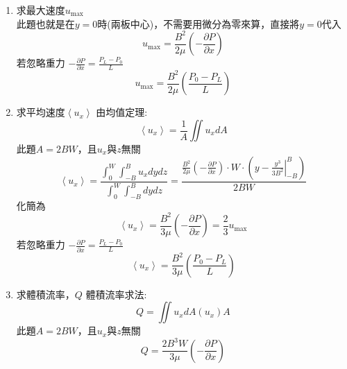 \documentclass[../main.tex]{subfiles}
\begin{document}
\begin{itemize}
\begin{enumerate}
      \begin{equation}
        \boxed{u_x = \frac{B^2}{2\mu}\left(\frac{P_0-P_L}{L}\right)\left[
          1-\left(\frac{y}{B}\right)^2
        \right]}
      \end{equation}
    \item 求最大速度$u_{\text{max}}$\\
      此題也就是在$y=0$時(兩板中心)，不需要用微分為零來算，直接將$y=0$代入
      \begin{equation}
        \boxed{u_{\text{max}} = \frac{B^2}{2\mu}\left(-\frac{\partial P}{\partial x}\right)}
      \end{equation}
      若忽略重力 $ -\frac{\partial P}{\partial x} = \frac{P_L-P_0}{L}$
      \begin{equation}
        \boxed{u_{\text{max}} = \frac{B^2}{2\mu}\left(\frac{P_0-P_L}{L}\right)}
      \end{equation}
    \item 求平均速度$\left<u_x\right>$
      由均值定理:
      \begin{equation}
        \left<u_x\right> =\frac{1}{A}\iint u_x dA
      \end{equation}
      此題$A=2BW$，且$u_x$與$z$無關
      \begin{equation}
        \left<u_x\right> = \frac{
          \int_0^W\int_{-B}^{B} u_x dy dz
        }{\int_0^W\int_{-B}^{B} dy dz} = \frac{\frac{B^2}{2\mu}\left(-\frac{\partial P}{\partial x}\right)\cdot W \cdot \left( \left.
          y- \frac{y^3}{3B^2}
        \right|_{-B}^{B}\right)}{2BW}\nonumber
      \end{equation}
      化簡為
      \begin{equation}
        \boxed{\left<u_x\right> = \frac{B^2}{3\mu}\left(-\frac{\partial P}{\partial x}\right) = \frac{2}{3}u_{\text{max}}}
      \end{equation}
      若忽略重力 $ -\frac{\partial P}{\partial x} = \frac{P_L-P_0}{L}$
      \begin{equation}
        \boxed{\left<u_x\right> = \frac{B^2}{3\mu}\left(\frac{P_0-P_L}{L}\right)}
      \end{equation}
    \item 求體積流率，$Q$
      體積流率求法:
      \begin{equation}
        Q =\iint u_xdA \left(u_x\right)A
      \end{equation}
      此題$A=2BW$，且$u_x$與$z$無關
      \begin{equation}
        \boxed{Q = \frac{2B^3W}{3\mu}\left(-\frac{\partial P}{\partial x}\right)}

\end{equation}
\end{enumerate}
\end{itemize}
\end{document}
